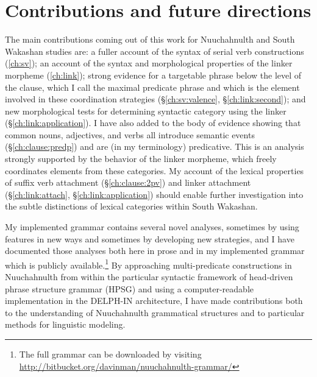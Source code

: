 \section{Contributions and future directions}

The main contributions coming out of this work for Nuuchahnulth and South Wakashan studies are: a fuller account of the syntax of serial verb constructions (\cref{ch:sv}); an account of the syntax and morphological properties of the linker morpheme (\cref{ch:link}); strong evidence for a targetable phrase below the level of the clause, which I call the maximal predicate phrase and which is the element involved in these coordination strategies (\S\ref{ch:sv:valence}, \S\ref{ch:link:second}); and new morphological tests for determining syntactic category using the linker (\S\ref{ch:link:application}). I have also added to the body of evidence showing that common nouns, adjectives, and verbs all introduce semantic events (\S\ref{ch:clause:predp}) and are (in my terminology) predicative. This is an analysis strongly supported by the behavior of the linker morpheme, which freely coordinates elements from these categories. My account of the lexical properties of suffix verb attachment (\S\ref{ch:clause:2pv}) and linker attachment (\S\ref{ch:link:attach}, \S\ref{ch:link:application}) should enable further investigation into the subtle distinctions of lexical categories within South Wakashan.

My implemented grammar contains several novel analyses, sometimes by using features in new ways and sometimes by developing new strategies, and I have documented those analyses both here in prose and in my implemented grammar which is publicly available.\footnote{The full grammar can be downloaded by visiting \url{http://bitbucket.org/davinman/nuuchahnulth-grammar/}} By approaching multi-predicate constructions in Nuuchahnulth from within the particular syntactic framework of head-driven phrase structure grammar (HPSG) and using a computer-readable implementation in the DELPH-IN architecture, I have made contributions both to the understanding of Nuuchahnulth grammatical structures and to particular methods for linguistic modeling.


